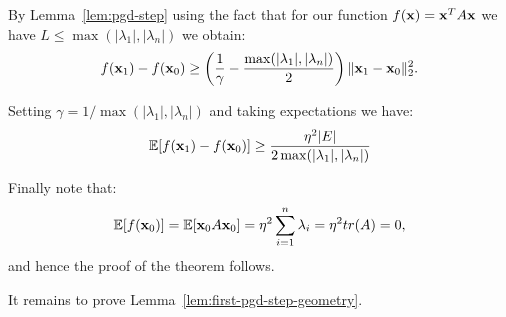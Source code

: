 %

By Lemma~\ref{lem:pgd-step} using the fact that for our function $f(\mathbf x) = \mathbf x^T A \mathbf x$ we have $L \le \max(|\lambda_1|, |\lambda_n|)$ we obtain:
$$f(\mathbf x_1) - f(\mathbf x_0) \ge \left(\frac{1}{\gamma} - \frac{\max( |\lambda_1|, |\lambda_n|)}{2}\right) \|\mathbf x_1 - \mathbf x_0\|_2^2.$$

Setting $\gamma = 1/ \max(|\lambda_1|, |\lambda_n|)$ and taking expectations we have:
$$\mathbb E[f(\mathbf x_1) - f(\mathbf x_0)] \ge \frac{\eta^2|E|}{2 \max(|\lambda_1|, |\lambda_n|)}  $$

Finally note that:
$$\mathbb E[f(\mathbf x_0)] = \mathbb E[\mathbf x_0 A \mathbf x_0] = \eta^2 \sum_{i = 1}^n \lambda_i = \eta^2 tr(A) = 0,$$
and hence the proof of the theorem follows.

It remains to prove Lemma~\ref{lem:first-pgd-step-geometry}.

